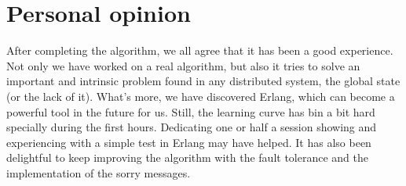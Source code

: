 \documentclass[a4paper, 10pt]{article}
\begin{document}
\section{Personal opinion}
After completing the algorithm, we all agree that it has been a good experience.
Not only we have worked on a real algorithm, but also it tries to solve an
important and intrinsic problem found in any distributed system, the global state (or the lack of it). What's more, we
have discovered Erlang, which can become a powerful tool in the future for us.
Still, the learning curve has bin a bit hard specially during the first
hours. Dedicating one or half a session showing and experiencing with a simple
test in Erlang may have helped. It has also been delightful to keep improving the algorithm with the fault tolerance and the implementation of the sorry messages.
\end{document}
